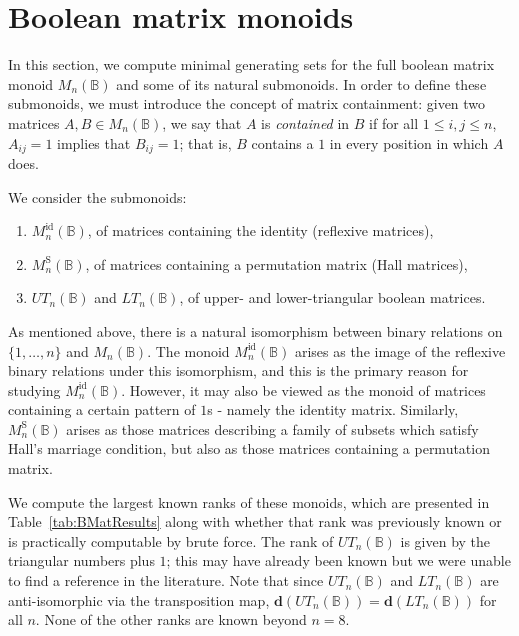 \documentclass[11pt]{article}
\numberwithin{equation}{section}
\newcommand{\B}{\mathbb{B}}
\newcommand{\Bn}{M_n(\B)}
\newcommand{\Refln}{M_n^{\text{id}}(\B)}
\newcommand{\Halln}{M_n^{\text{S}}(\B)}
\newcommand{\UTn}{UT_n(\B)}
\newcommand{\LTn}{LT_n(\B)}
\begin{document}

\section{Boolean matrix monoids}
\label{sec:boolmat}

In this section, we compute minimal generating sets for the full boolean matrix
monoid $\Bn$ and some of its natural submonoids. In order to define these
submonoids, we must introduce the concept of matrix containment: given two
matrices $A, B \in \Bn$, we say that $A$ is \emph{contained} in $B$ if for all
$1 \leq i,j \leq n$, $A_{ij} = 1$ implies that $B_{ij} = 1$; that is, $B$ contains
a $1$ in every position in which $A$ does.

We consider the submonoids:
\begin{enumerate}[label={\rm (\roman*)}]
  \item $\Refln$, of matrices containing the identity (reflexive matrices),
  \item $\Halln$, of matrices containing a permutation matrix (Hall matrices),
  \item $\UTn$ and $\LTn$, of upper- and lower-triangular boolean matrices.
\end{enumerate}

As mentioned above, there is a natural isomorphism between binary relations on
$\{1, \ldots, n\}$ and $\Bn$.  The monoid $\Refln$ arises as the image of the
reflexive binary relations under this isomorphism, and this is the primary
reason for studying $\Refln$. However, it may also be viewed as the monoid of
matrices containing a certain pattern of $1$s - namely the identity matrix.
Similarly, $\Halln$ arises as those matrices describing a family of subsets
which satisfy Hall's marriage condition, but also as those matrices containing a
permutation matrix.

We compute the largest known ranks of these monoids, which are presented in
Table~\ref{tab:BMatResults} along with whether that rank was previously known or
is practically computable by brute force. The rank of $\UTn$ is given by the
triangular numbers plus $1$; this may have already been known but we
were unable to find a reference in the literature. Note that since $\UTn$ and
$\LTn$ are anti-isomorphic via the transposition map, $\mathbf{d}(\UTn) =
\mathbf{d}(\LTn)$ for all $n$. None of the other ranks are known beyond $n = 8$. 
\end{document}
